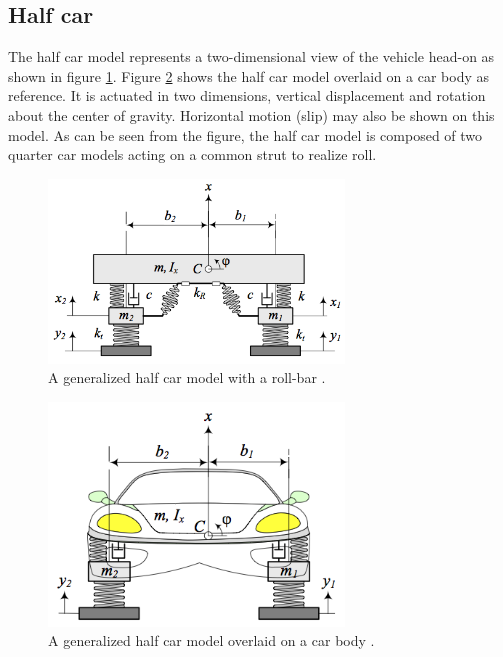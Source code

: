 \subsection{Half car}
The half car model represents a two-dimensional view of the vehicle head-on as shown in figure \ref{fig:half_car}. Figure \ref{fig:half_car_pretty} shows the half car model overlaid on a car body as reference. It is actuated in two dimensions, vertical displacement and rotation about the center of gravity. Horizontal motion (slip) may also be shown on this model. As can be seen from the figure, the half car model is composed of two quarter car models acting on a common strut to realize roll.

\begin{figure}[t]
	\centering
	\includegraphics[width=0.7\textwidth]{figures/half_car.png}
	\caption{A generalized half car model with a roll-bar \cite{book:jazar}.}
	\label{fig:half_car}
\end{figure}

\begin{figure}[t]
	\centering
	\includegraphics[width=0.7\textwidth]{figures/half_car_pretty.png}
	\caption{A generalized half car model overlaid on a car body \cite{book:jazar}.}
	\label{fig:half_car_pretty}
\end{figure}

